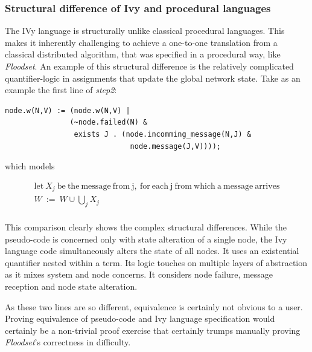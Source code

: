 \documentclass[fleqn]{article}
\begin{document}
\subsubsection{Structural difference of Ivy and procedural languages}
The IVy language is structurally unlike classical procedural languages. This makes it inherently challenging to achieve a one-to-one translation from a classical distributed algorithm, that was specified in a procedural way, like \textit{Floodset}. An example of this structural difference is the relatively complicated quantifier-logic in assignments that update the global network state. Take as an example the first line of \textit{step2}:

\begin{mdframed}[nobreak=true, backgroundcolor=light-gray, roundcorner=10pt,leftmargin=1, rightmargin=1, innerleftmargin=15, innertopmargin=15,innerbottommargin=15, outerlinewidth=1, linecolor=light-gray]
\begin{lstlisting}
node.w(N,V) := (node.w(N,V) |
               (~node.failed(N) &
                exists J . (node.incomming_message(N,J) &
                             node.message(J,V))));
\end{lstlisting}
\end{mdframed}

\noindent which models

\begin{mdframed}[nobreak=true, backgroundcolor=light-gray, roundcorner=10pt,leftmargin=1, rightmargin=1, innerleftmargin=15, innertopmargin=15,innerbottommargin=15, outerlinewidth=1, linecolor=light-gray]
\begin{gather*}
  \mathrm{let}\ X_j\ \mathrm{be\ the\ message\ from\ j,\ for\ each\ j\ from\ which\ a\ message\ arrives}\\
  W\ :=\ W \cup \bigcup_{j} X_j\\
\end{gather*}
\end{mdframed}

This comparison clearly shows the complex structural differences. While the pseudo-code is concerned only with state alteration of a single node, the Ivy language code simultaneously alters the state of all nodes. It uses an existential quantifier nested within a term. Its logic touches on multiple layers of abstraction as it mixes system and node concerns. It considers node failure, message reception and node state alteration.

As these two lines are so different, equivalence is certainly not obvious to a user. Proving equivalence of pseudo-code and Ivy language specification would certainly be a non-trivial proof exercise that certainly trumps manually proving \textit{Floodset}'s correctness in difficulty.
\end{document}
